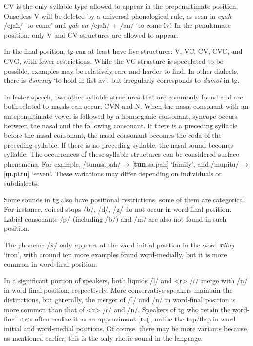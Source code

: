 CV is the only syllable type allowed to appear in the prepenultimate position. Onsetless V will be deleted by a universal phonological rule, as seen in \textit{eyah} /ejaħ/ `to come' and \textit{yah-an} /ejaħ/ + /an/ `to come \acs{lv}'. In the penultimate position, only V and CV structures are allowed to appear.

In the final position, \acl{tg} can at least have five structures: V, VC, CV, CVC, and CVG, with fewer restrictions. While the VC structure is speculated to be possible, examples may be relatively rare and harder to find. In other dialects, there is \textit{dəmuuy} `to hold in fist \acs{av}', but irregularly corresponds to \textit{dumoi} in \acl{tg}.

In faster speech, two other syllable structures that are commonly found and are both related to nasals can occur: CVN and N̩. When the nasal consonant with an antepenultimate vowel is followed by a homorganic consonant, syncope occurs between the nasal and the following consonant. If there is a preceding syllable before the nasal consonant, the nasal consonant becomes the coda of the preceding syllable. If there is no preceding syllable, the nasal sound becomes syllabic. The occurrences of these syllable structures can be considered surface phenomena. For example, /tunusapaħ/ → [\textbf{tun}.sa.paħ] `family', and /mupitu/ → [\textbf{m̩}.pi.tu] `seven'. These variations may differ depending on individuals or subdialects.

Some sounds in \acl{tg} also have positional restrictions, some of them are categorical. For instance, voiced stops /b/, /d/, /g/ do not occur in word-final position. Labial consonants /p/ (including /b/) and /m/ are also not found in such position. 

The phoneme /x/ only appears at the word-initial position in the word \textit{\textbf{x}iluy} `iron', with around ten more examples found word-medially, but it is more common in word-final position.

In a significant portion of speakers, both liquids /l/ and <r> /ɾ/ merge with /n/ in word-final position, respectively. More conservative speakers maintain the distinctions, but generally, the merger of /l/ and /n/ in word-final position is more common than that of <r> /ɾ/ and /n/. Speakers of \acl{tg} who retain the word-final <r> often realize it as an approximant [ɹ\~{}ɻ], unlike the tap/flap in word-initial and word-medial positions. Of course, there may be more variants because, as mentioned earlier, this is the only rhotic sound in the language.

